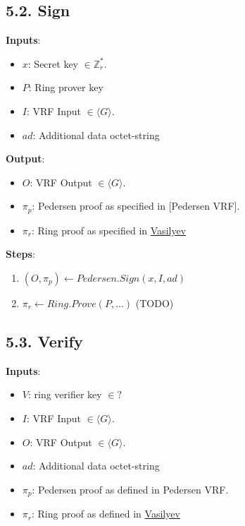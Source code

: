 \documentclass[
]{article}
\providecommand{\tightlist}{%
  \setlength{\itemsep}{0pt}\setlength{\parskip}{0pt}}
\begin{document}
\hypertarget{sign-2}{%
\subsection{5.2. Sign}\label{sign-2}}

\textbf{Inputs}:

\begin{itemize}
\tightlist
\item
  \(x\): Secret key \(\in \mathbb{Z}^*_r\).
\item
  \(P\): Ring prover key
\item
  \(I\): VRF Input \(\in \langle G \rangle\).
\item
  \(ad\): Additional data octet-string
\end{itemize}

\textbf{Output}:

\begin{itemize}
\tightlist
\item
  \(O\): VRF Output \(\in \langle G \rangle\).
\item
  \(\pi_p\): Pedersen proof as specified in {[}Pedersen VRF{]}.
\item
  \(\pi_r\): Ring proof as specified in
  \href{https://hackmd.io/ulW5nFFpTwClHsD0kusJAA}{Vasilyev}
\end{itemize}

\textbf{Steps}:

\begin{enumerate}
\def\labelenumi{\arabic{enumi}.}
\tightlist
\item
  \((O, \pi_p) \leftarrow Pedersen.Sign(x, I, ad)\)
\item
  \(\pi_r \leftarrow Ring.Prove(P, ...)\) (TODO)
\end{enumerate}

\hypertarget{verify-2}{%
\subsection{5.3. Verify}\label{verify-2}}

\textbf{Inputs}:

\begin{itemize}
\tightlist
\item
  \(V\): ring verifier key \(\in ?\)
\item
  \(I\): VRF Input \(\in \langle G \rangle\).
\item
  \(O\): VRF Output \(\in \langle G \rangle\).
\item
  \(ad\): Additional data octet-string
\item
  \(\pi_p\): Pedersen proof as defined in Pedersen VRF.
\item
  \(\pi_r\): Ring proof as defined in
  \href{https://hackmd.io/ulW5nFFpTwClHsD0kusJAA}{Vasilyev}
\end{itemize}
\end{document}

